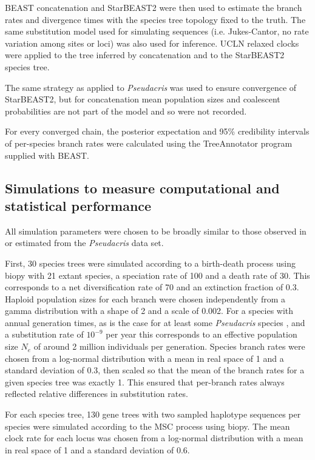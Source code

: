 \documentclass[nogrid]{MBE}%
\begin{document}
BEAST concatenation and StarBEAST2 were then used to estimate the branch rates
and divergence times with the species tree topology fixed to the truth. The same
substitution model used for simulating sequences (i.e. Jukes-Cantor, no rate
variation among sites or loci) was also used for inference. UCLN relaxed
clocks were applied to the tree inferred by concatenation and to the
StarBEAST2 species tree.

The same strategy as applied to \textit{Pseudacris} was used to ensure
convergence of StarBEAST2, but for concatenation mean population sizes and coalescent
probabilities are not part of the model and so were not recorded.

For every converged chain, the posterior expectation and 95\% credibility
intervals of per-species branch rates were calculated using the TreeAnnotator
program supplied with BEAST.

\subsection{Simulations to measure computational and statistical performance}

All simulation parameters were chosen to be broadly similar to those observed in
or estimated from the \textit{Pseudacris} data set.

First, 30 species trees were simulated according to a birth-death process
\citep{Gernhard2008769} using biopy with 21 extant species, a speciation rate
of 100 and a death rate of 30. This corresponds to a net diversification rate
of 70 and an extinction fraction of 0.3. Haploid population sizes for each
branch were chosen independently from a gamma distribution with a shape of 2
and a scale of 0.002. For a species with annual generation times, as is the
case for at least some \textit{Pseudacris} species \citep{10.2307/1446044},
and a substitution rate of $10^{-9}$ per year this corresponds to an effective
population size $N_e$ of around 2 million individuals per generation. Species
branch rates were chosen from a log-normal distribution with a mean in real
space of 1 and a standard deviation of 0.3, then scaled so that the mean of
the branch rates for a given species tree was exactly 1. This ensured that
per-branch rates always reflected relative differences in substitution rates.

For each species tree, 130 gene trees with two sampled haplotype sequences per
species were simulated according to the MSC process using biopy. The mean
clock rate for each locus was chosen from a log-normal distribution with a
mean in real space of 1 and a standard deviation of 0.6.
\end{document}
